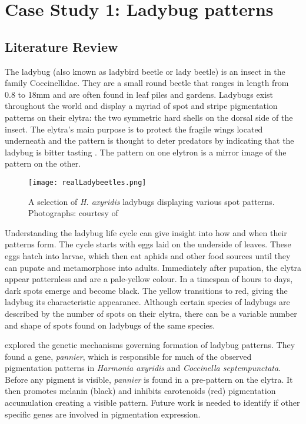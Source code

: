 \chapter{Case Study 1: Ladybug patterns}

\section{Literature Review}
The ladybug (also known as ladybird beetle or lady beetle) is an insect in the family Coccinellidae. They are a small round beetle that ranges in length from 0.8 to 18mm \citep{King1996} and are often found in leaf piles and gardens. Ladybugs exist throughout the world and display a myriad of spot and stripe pigmentation patterns on their elytra: the two symmetric hard shells on the dorsal side of the insect. The elytra's main purpose is to protect the fragile wings located underneath and the pattern is thought to deter predators by indicating that the ladybug is bitter tasting \citep{King1996}. The pattern on one elytron is a mirror image of the pattern on the other. 

\begin{figure}[ht]
	\centering
	\texttt{[image: realLadybeetles.png]}
	\caption{A selection of \textit{H. axyridis} ladybugs displaying various spot patterns. \textcolor{citation-gray}{Photographs: courtesy of \citet{Entomart2019}}}
	\label{fig:realLadyBugPatterns}
\end{figure}

Understanding the ladybug life cycle can give insight into how and when their patterns form. The cycle starts with eggs laid on the underside of leaves. These eggs hatch into larvae, which then eat aphids and other food sources until they can pupate and metamorphose into adults. Immediately after pupation, the elytra appear patternless and are a pale-yellow colour. In a timespan of hours to days, dark spots emerge and become black. The yellow transitions to red, giving the ladybug its characteristic appearance. Although certain species of ladybugs are described by the number of spots on their elytra, there can be a variable number and shape of spots found on ladybugs of the same species.

\citet{Ando2018} explored the genetic mechanisms governing formation of ladybug patterns. They found a gene, \textit{pannier}, which is responsible for much of the observed pigmentation patterns in \textit{Harmonia axyridis} and \textit{Coccinella septempunctata}. Before any pigment is visible, \textit{pannier} is found in a pre-pattern on the elytra. It then promotes melanin (black) and inhibits carotenoids (red) pigmentation accumulation creating a visible pattern. Future work is needed to identify if other specific genes are involved in pigmentation expression.

